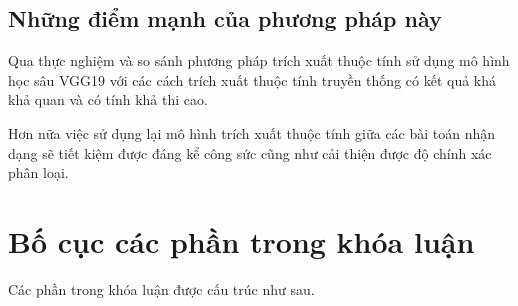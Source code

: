 \documentclass[12pt]{report}
\begin{document}
																																																												
																																																												
		\subsection{Những điểm mạnh của phương pháp này}
		Qua thực nghiệm và so sánh phương pháp trích xuất thuộc tính sử dụng mô hình học sâu VGG19 \cite{cia_vgg19} với các cách trích xuất thuộc tính truyền thống có kết quả khá khả quan và có tính khả thi cao.
																																																								
		Hơn nữa việc sử dụng lại mô hình trích xuất thuộc tính giữa các bài toán nhận dạng sẽ tiết kiệm được đáng kể công sức cũng như cải thiện được độ chính xác phân loại.
																																																								
		\section{Bố cục các phần trong khóa luận}
		Các phần trong khóa luận được cấu trúc như sau.
																																																								
\end{document}
